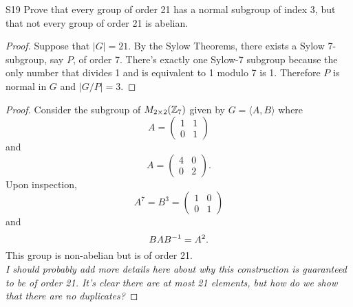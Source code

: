 \documentclass[../AlgebraQualSolutions.tex]{subfiles}
\begin{document}
	
	\begin{prob}{S19}{}
	Prove that every group of order 21 has a normal subgroup of index 3, but that not every group of order 21 is abelian.
	\end{prob}
	
	\begin{proof}
	Suppose that $|G| = 21$. By the Sylow Theorems, there exists a Sylow 7-subgroup, say $P$, of order 7. There's exactly one Sylow-7 subgroup because the only number that divides 1 and is equivalent to 1 modulo 7 is 1. Therefore $P$ is normal in $G$ and $|G/P| = 3$.
	\end{proof}
	
	\begin{proof}
	Consider the subgroup of $M_{2\times2}(\mathbb{Z}_7)$ given by $G = \langle A, B \rangle$ where
		\[ A = \begin{pmatrix}
		1 & 1 \\
		0 & 1 \end{pmatrix} \]
	and
		\[ A = \begin{pmatrix}
		4 & 0 \\
		0 & 2 \end{pmatrix}. \]
	Upon inspection, 
		\[ A^7 = B^3 = \begin{pmatrix} 1 & 0 \\ 0 & 1 \end{pmatrix} \]
	and
		\[BAB^{-1} = A^2. \]
	This group is non-abelian but is of order 21.\\
	
	\emph{I should probably add more details here about why this construction is guaranteed to be of order 21. It's clear there are at most 21 elements, but how do we show that there are no duplicates?}
	\end{proof}
\end{document}

